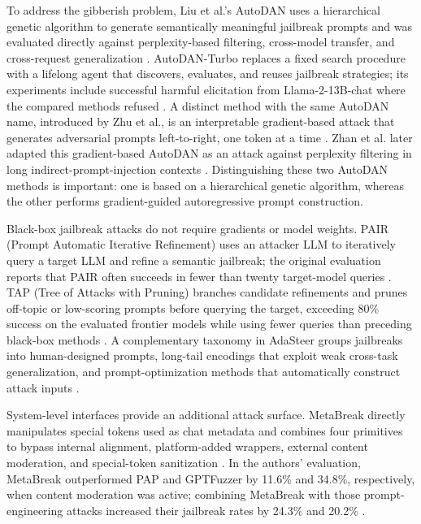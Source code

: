 \documentclass[11pt,a4paper]{article}
\begin{document}
To address the gibberish problem, Liu et al.'s AutoDAN uses a hierarchical genetic algorithm to generate semantically meaningful jailbreak prompts and was evaluated directly against perplexity-based filtering, cross-model transfer, and cross-request generalization \cite{Liu_2024_AutoDAN_1d6cff47}. AutoDAN-Turbo replaces a fixed search procedure with a lifelong agent that discovers, evaluates, and reuses jailbreak strategies; its experiments include successful harmful elicitation from Llama-2-13B-chat where the compared methods refused \cite{Liu_2024_LLMs_f40cf88b}. A distinct method with the same AutoDAN name, introduced by Zhu et al., is an interpretable gradient-based attack that generates adversarial prompts left-to-right, one token at a time \cite{Zhu_2023_AutoDAN_2563e630}. Zhan et al. later adapted this gradient-based AutoDAN as an attack against perplexity filtering in long indirect-prompt-injection contexts \cite{Zhan_2025_LLM_ab9a7822}. Distinguishing these two AutoDAN methods is important: one is based on a hierarchical genetic algorithm, whereas the other performs gradient-guided autoregressive prompt construction.

Black-box jailbreak attacks do not require gradients or model weights. PAIR (Prompt Automatic Iterative Refinement) uses an attacker LLM to iteratively query a target LLM and refine a semantic jailbreak; the original evaluation reports that PAIR often succeeds in fewer than twenty target-model queries \cite{Chao_2025_PAIR_590bf40a}. TAP (Tree of Attacks with Pruning) branches candidate refinements and prunes off-topic or low-scoring prompts before querying the target, exceeding 80\% success on the evaluated frontier models while using fewer queries than preceding black-box methods \cite{Mehrotra_2024_TAP_b0ffafed}. A complementary taxonomy in AdaSteer groups jailbreaks into human-designed prompts, long-tail encodings that exploit weak cross-task generalization, and prompt-optimization methods that automatically construct attack inputs \cite{Zhao_2025_LLM_45bb4e13}.

System-level interfaces provide an additional attack surface. MetaBreak directly manipulates special tokens used as chat metadata and combines four primitives to bypass internal alignment, platform-added wrappers, external content moderation, and special-token sanitization \cite{Zhu_2025_LLM_dbd8c508}. In the authors' evaluation, MetaBreak outperformed PAP and GPTFuzzer by 11.6\% and 34.8\%, respectively, when content moderation was active; combining MetaBreak with those prompt-engineering attacks increased their jailbreak rates by 24.3\% and 20.2\% \cite{Zhu_2025_LLM_dbd8c508}.
\end{document}
